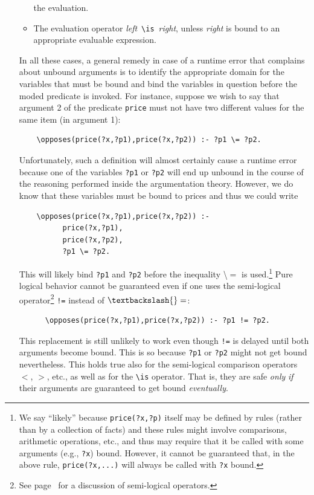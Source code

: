 \documentclass[11pt]{article}
\newcommand{\bs}{\textbackslash}
\begin{document}
\begin{itemize}
\begin{itemize}
    the evaluation.
  \item  The evaluation operator \emph{left}~\texttt{\bs{}is}~\emph{right},
    unless \emph{right} is bound to an appropriate evaluable expression.  
  \end{itemize}
  In all these cases, a general remedy in case of a runtime error
  that complains about unbound arguments
  is to identify the appropriate
  domain for the variables that must be bound and bind the variables in
  question before the moded predicate is invoked. For instance, suppose we
  wish to say that argument 2 of the predicate \texttt{price}  
  must not have two different values for the same item (in argument 1):
\begin{verbatim}
    \opposes(price(?x,?p1),price(?x,?p2)) :- ?p1 \= ?p2.
\end{verbatim}
  Unfortunately, such a definition will almost certainly cause a runtime error because one
  of the variables \texttt{?p1} or \texttt{?p2} will end up unbound in the course of
  the reasoning performed inside the argumentation theory.  
  However, we do know that these variables must be bound to
  prices and thus we could write
\begin{verbatim}
    \opposes(price(?x,?p1),price(?x,?p2)) :-
          price(?x,?p1),
          price(?x,?p2),
          ?p1 \= ?p2.
\end{verbatim}
  This will likely bind \texttt{?p1} and \texttt{?p2} before the
  inequality \bs$=$ is used.\footnote{
    We say ``likely'' because \texttt{price(?x,?p)} itself may be defined
    by rules (rather than by a collection of facts)
    and these rules might involve comparisons, arithmetic operations, etc., and thus
    may require that it be called with some arguments (e.g., \texttt{?x})
    bound. However, it cannot be guaranteed that, in the above rule,
    \texttt{price(?x,...)}  will always be called with \texttt{?x} bound. 
  }
  Pure logical behavior cannot be guaranteed even if one uses the
  semi-logical operator\footnote{
    See page~\pageref{pg-semi-logical} for a discussion of semi-logical
    operators.
  }
  \texttt{!=} instead of $\bs{}=$:
\begin{verbatim}
      \opposes(price(?x,?p1),price(?x,?p2)) :- ?p1 != ?p2.
\end{verbatim}
  This replacement is still unlikely to work even though \texttt{!=} is delayed until both
  arguments become bound. This is so because \texttt{?p1} or \texttt{?p2}
  might not get bound nevertheless.
  This holds true also for the semi-logical comparison operators $<$, $>$,
  etc., as well as for the
  \texttt{\bs{}is} operator. That is, they are
  safe \emph{only} \emph{if} their
  arguments are guaranteed to get bound \emph{eventually}.  
\end{itemize}
\end{document}
